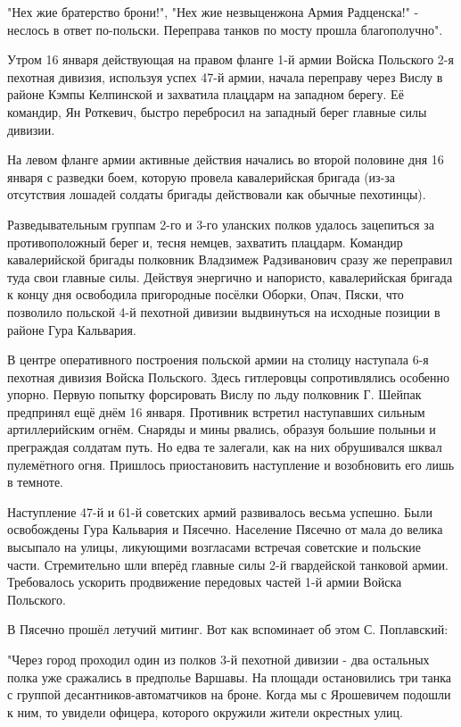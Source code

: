 "Нех жие братерство брони!", "Нех жие незвыценжона Армия Радценска!" - неслось
в ответ по-польски. Переправа танков по мосту прошла благополучно". 

Утром 16 января действующая на правом фланге 1-й армии Войска Польского 2-я
пехотная дивизия, используя успех 47-й армии, начала переправу через Вислу в
районе Кэмпы Келпинской и захватила плацдарм на западном берегу. Её командир,
Ян Роткевич, быстро перебросил на западный берег главные силы дивизии. 

На левом фланге армии активные действия начались во второй половине дня 16
января с разведки боем, которую провела кавалерийская бригада (из-за отсутствия
лошадей солдаты бригады действовали как обычные пехотинцы). 

Разведывательным группам 2-го и 3-го уланских полков удалось зацепиться за
противоположный берег и, тесня немцев, захватить плацдарм. Командир
кавалерийской бригады полковник Владзимеж Радзиванович сразу же переправил туда
свои главные силы. Действуя энергично и напористо, кавалерийская бригада к
концу дня освободила пригородные посёлки Оборки, Опач, Пяски, что позволило
польской 4-й пехотной дивизии выдвинуться на исходные позиции в районе Гура
Кальвария. 

В центре оперативного построения польской армии на столицу наступала 6-я
пехотная дивизия Войска Польского. Здесь гитлеровцы сопротивлялись особенно
упорно. Первую попытку форсировать Вислу по льду полковник Г. Шейпак предпринял
ещё днём 16 января. Противник встретил наступавших сильным артиллерийским
огнём. Снаряды и мины рвались, образуя большие полыньи и преграждая солдатам
путь. Но едва те залегали, как на них обрушивался шквал пулемётного огня.
Пришлось приостановить наступление и возобновить его лишь в темноте. 

Наступление 47-й и 61-й советских армий развивалось весьма успешно. Были
освобождены Гура Кальвария и Пясечно. Население Пясечно от мала до велика
высыпало на улицы, ликующими возгласами встречая советские и польские части.
Стремительно шли вперёд главные силы 2-й гвардейской танковой армии.
Требовалось ускорить продвижение передовых частей 1-й армии Войска Польского. 

В Пясечно прошёл летучий митинг. Вот как вспоминает об этом С. Поплавский: 

"Через город проходил один из полков 3-й пехотной дивизии - два остальных полка
уже сражались в предполье Варшавы. На площади остановились три танка с группой
десантников-автоматчиков на броне. Когда мы с Ярошевичем подошли к ним, то
увидели офицера, которого окружили жители окрестных улиц. 

